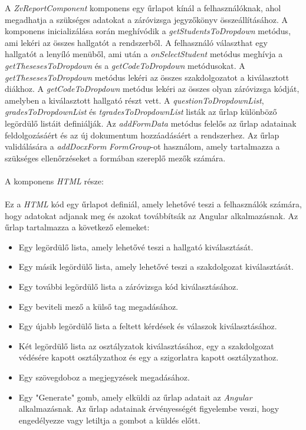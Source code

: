 A \textit{ZvReportComponent} komponens egy űrlapot kínál a felhasználóknak, ahol megadhatja a szükséges adatokat a záróvizsga jegyzőkönyv összeállításához. A komponens inicializálása során meghívódik a \textit{getStudentsToDropdown} metódus, ami lekéri az összes hallgatót a rendszerből. A felhasználó választhat egy hallgatót a lenyíló menüből, ami után a \textit{onSelectStudent} metódus meghívja a \textit{getThesesesToDropdown} és a \textit{getCodeToDropdown} metódusokat. A \textit{getThesesesToDropdown} metódus lekéri az összes szakdolgozatot a kiválasztott diákhoz. A \textit{getCodeToDropdown} metódus lekéri az összes olyan záróvizsga kódját, amelyben a kiválasztott hallgató részt vett. A \textit{questionToDropdownList}, \textit{gradesToDropdownList} és \textit{tgradesToDropdownList} listák az űrlap különböző legördülő listáit definiálják. Az \textit{addFormData} metódus felelős az űrlap adatainak feldolgozásáért és az új dokumentum hozzáadásáért a rendszerhez. Az űrlap validálására a \textit{addDocxForm} \textit{FormGroup}-ot használom, amely tartalmazza a szükséges ellenőrzéseket a formában szereplő mezők számára.\\
\\A komponens \textit{HTML} része:\\
\\
Ez a \textit{HTML} kód egy űrlapot definiál, amely lehetővé teszi a felhasználók számára, hogy adatokat adjanak meg és azokat továbbítsák az Angular alkalmazásnak. Az űrlap tartalmazza a következő elemeket:

\begin{itemize}

\item{}Egy legördülő lista, amely lehetővé teszi a hallgató kiválasztását.
\item{}Egy másik legördülő lista, amely lehetővé teszi a szakdolgozat kiválasztását.
\item{}Egy további legördülő lista a záróvizsga kód kiválasztásához.
\item{}Egy beviteli mező a külső tag megadásához.
\item{}Egy újabb legördülő lista a feltett kérdések és válaszok kiválasztásához.
\item{}Két legördülő lista az osztályzatok kiválasztásához, egy a szakdolgozat védésére kapott osztályzathoz és egy a szigorlatra kapott osztályzathoz.
\item{}Egy szövegdoboz a megjegyzések megadásához.
\item{}Egy "Generate" gomb, amely elküldi az űrlap adatait az \textit{Angular} alkalmazásnak. Az űrlap adatainak érvényességét figyelembe veszi, hogy engedélyezze vagy letiltja a gombot a küldés előtt.

\end{itemize}